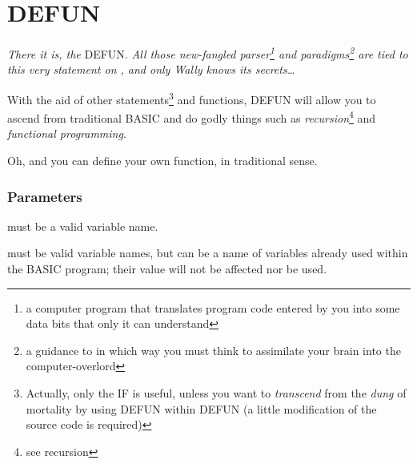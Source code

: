 \section{DEFUN}

\emph{There it is, the} DEFUN. \emph{All those new-fangled parser\footnote{a computer program that translates program code entered by you into some data bits that only it can understand} and paradigms\footnote{a guidance to in which way you must think to assimilate your brain into the computer-overlord} are tied to this very statement on \tbas, and only Wally knows its secrets\ldots}


With the aid of other statements\footnote{Actually, only the IF is useful, unless you want to \emph{transcend} from the \emph{dung} of mortality by using DEFUN within DEFUN (a little modification of the source code is required)} and functions, DEFUN will allow you to ascend from traditional BASIC and do godly things such as \emph{recursion}\footnote{see recursion} and \emph{functional programming}.

Oh, and you can define your own function, in traditional  sense.

\subsubsection*{Parameters}

\begin{itemlist}
\item {} must be a valid variable name.
\item {} must be valid variable names, but can be a name of variables already used within the BASIC program; their value will not be affected nor be used.
\end{itemlist}
